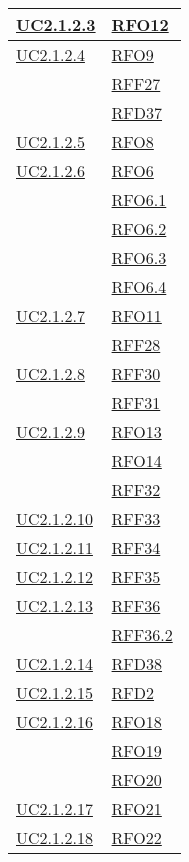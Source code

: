 \begin{longtable}{|>{\centering}m{5cm}|m{5cm}<{\centering}|}
	\hyperref[UC2.1.2.3]{UC2.1.2.3} & \hyperlink{RFO12}{RFO12}\\ \hline
	\hyperref[UC2.1.2.4]{UC2.1.2.4} & \hyperlink{RFO9}{RFO9}\\
	& \hyperlink{RFF27}{RFF27}\\
	& \hyperlink{RFD37}{RFD37}\\ \hline
	\hyperref[UC2.1.2.5]{UC2.1.2.5} & \hyperlink{RFO8}{RFO8}\\ \hline
	\hyperref[UC2.1.2.6]{UC2.1.2.6} & \hyperlink{RFO6}{RFO6}\\
	& \hyperlink{RFO6.1}{RFO6.1}\\
	& \hyperlink{RFO6.2}{RFO6.2}\\
	& \hyperlink{RFO6.3}{RFO6.3}\\
	& \hyperlink{RFO6.4}{RFO6.4}\\ \hline
	\hyperref[UC2.1.2.7]{UC2.1.2.7} & \hyperlink{RFO11}{RFO11}\\
	& \hyperlink{RFF28}{RFF28}\\ \hline
	\hyperref[UC2.1.2.8]{UC2.1.2.8} & \hyperlink{RFF30}{RFF30}\\
	& \hyperlink{RFF31}{RFF31}\\ \hline
	\hyperref[UC2.1.2.9]{UC2.1.2.9} & \hyperlink{RFO13}{RFO13}\\
	& \hyperlink{RFO14}{RFO14}\\
	& \hyperlink{RFF32}{RFF32}\\ \hline
	\hyperref[UC2.1.2.10]{UC2.1.2.10} & \hyperlink{RFF33}{RFF33}\\ \hline
	\hyperref[UC2.1.2.11]{UC2.1.2.11} & \hyperlink{RFF34}{RFF34}\\ \hline
	\hyperref[UC2.1.2.12]{UC2.1.2.12} & \hyperlink{RFF35}{RFF35}\\ \hline
	\hyperref[UC2.1.2.13]{UC2.1.2.13} & \hyperlink{RFF36}{RFF36}\\
	& \hyperlink{RFF36.2}{RFF36.2}\\ \hline
	\hyperref[UC2.1.2.14]{UC2.1.2.14} & \hyperlink{RFD38}{RFD38}\\ \hline
	\hyperref[UC2.1.2.15]{UC2.1.2.15} & \hyperlink{RFD2}{RFD2}\\ \hline
	\hyperref[UC2.1.2.16]{UC2.1.2.16} & \hyperlink{RFO18}{RFO18}\\
	& \hyperlink{RFO19}{RFO19}\\
	& \hyperlink{RFO20}{RFO20}\\ \hline
	\hyperref[UC2.1.2.17]{UC2.1.2.17} & \hyperlink{RFO21}{RFO21}\\ \hline
	\hyperref[UC2.1.2.18]{UC2.1.2.18} & \hyperlink{RFO22}{RFO22}\\ \hline

\end{longtable}
